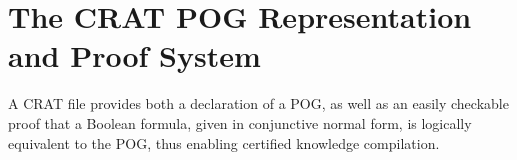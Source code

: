 \documentclass[letterpaper,USenglish,cleveref, autoref, thm-restate]{lipics-v2021}
\newcommand{\nil}{\bot}
\newcommand{\obar}[1]{\overline{#1}}
\begin{document}
\section{The CRAT POG Representation and Proof System}
\label{sect:crat}


A CRAT file provides both a declaration of a POG, as well as an easily checkable
proof that a Boolean formula, given in conjunctive normal
form, is logically equivalent to the POG, thus enabling certified
knowledge compilation.
\end{document}
